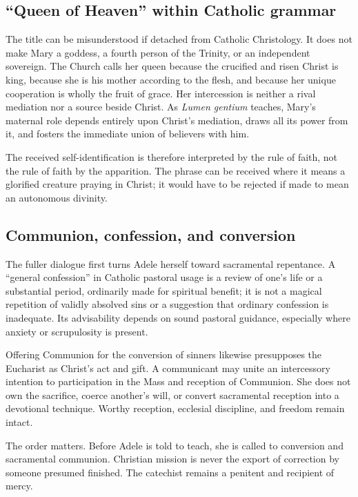 \subsection{“Queen of Heaven” within Catholic grammar}

The title can be misunderstood if detached from Catholic Christology. It does not make Mary a goddess, a fourth person of the Trinity, or an independent sovereign. The Church calls her queen because the crucified and risen Christ is king, because she is his mother according to the flesh, and because her unique cooperation is wholly the fruit of grace. Her intercession is neither a rival mediation nor a source beside Christ. As \emph{Lumen gentium} teaches, Mary's maternal role depends entirely upon Christ's mediation, draws all its power from it, and fosters the immediate union of believers with him.

The received self-identification is therefore interpreted by the rule of faith, not the rule of faith by the apparition. The phrase can be received where it means a glorified creature praying in Christ; it would have to be rejected if made to mean an autonomous divinity.

\subsection{Communion, confession, and conversion}

The fuller dialogue first turns Adele herself toward sacramental repentance. A “general confession” in Catholic pastoral usage is a review of one's life or a substantial period, ordinarily made for spiritual benefit; it is not a magical repetition of validly absolved sins or a suggestion that ordinary confession is inadequate. Its advisability depends on sound pastoral guidance, especially where anxiety or scrupulosity is present.

Offering Communion for the conversion of sinners likewise presupposes the Eucharist as Christ's act and gift. A communicant may unite an intercessory intention to participation in the Mass and reception of Communion. She does not own the sacrifice, coerce another's will, or convert sacramental reception into a devotional technique. Worthy reception, ecclesial discipline, and freedom remain intact.

The order matters. Before Adele is told to teach, she is called to conversion and sacramental communion. Christian mission is never the export of correction by someone presumed finished. The catechist remains a penitent and recipient of mercy.

